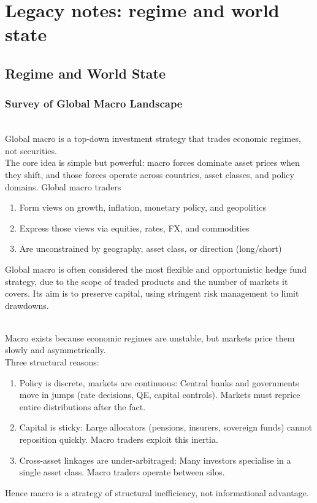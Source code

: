 \documentclass[a4paper,oneside,openany]{book}
\begin{document}
\chapter*{Legacy notes: regime and world state}

\section{Regime and World State}

\subsection*{Survey of Global Macro Landscape}

\begin{definition} \\
Global macro is a top-down investment strategy that trades economic regimes, not securities.\\
The core idea is simple but powerful: macro forces dominate asset prices when they shift, and those forces operate across countries, asset classes, and policy domains. Global macro traders
\begin{enumerate}[label=\roman*.]
\setlength{\itemsep}{0pt}
\item Form views on growth, inflation, monetary policy, and geopolitics
\item Express those views via equities, rates, FX, and commodities
\item Are unconstrained by geography, asset class, or direction (long/short)
\end{enumerate}
Global macro is often considered the most flexible and opportunistic hedge fund strategy, due to the scope of traded products and the number of markets it covers. Its aim is to preserve capital, using stringent risk management to limit drawdowns.
\end{definition}

\begin{remark} \\
Macro exists because economic regimes are unstable, but markets price them slowly and asymmetrically.\\
Three structural reasons:
\begin{enumerate}[label=\roman*.]
\setlength{\itemsep}{0pt}
\item Policy is discrete, markets are continuous: Central banks and governments move in jumps (rate decisions, QE, capital controls). Markets must reprice entire distributions after the fact.
\item Capital is sticky: Large allocators (pensions, insurers, sovereign funds) cannot reposition quickly. Macro traders exploit this inertia.
\item Cross-asset linkages are under-arbitraged: Many investors specialise in a single asset class. Macro traders operate between silos.
\end{enumerate}
Hence macro is a strategy of structural inefficiency, not informational advantage.
\end{remark}
\end{document}
